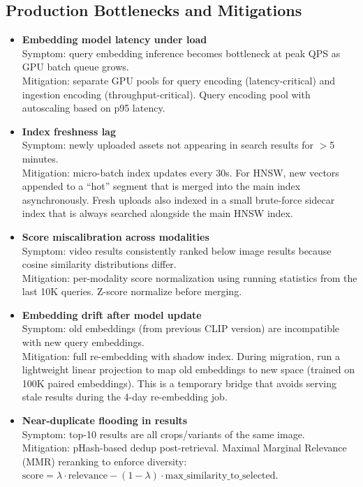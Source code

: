 \subsection*{Production Bottlenecks and Mitigations}

\begin{itemize}
  \item \textbf{Embedding model latency under load}\\
    Symptom: query embedding inference becomes bottleneck at peak QPS as GPU batch queue grows.\\
    Mitigation: separate GPU pools for query encoding (latency-critical) and ingestion encoding (throughput-critical). Query encoding pool with autoscaling based on p95 latency.

  \item \textbf{Index freshness lag}\\
    Symptom: newly uploaded assets not appearing in search results for $>$5 minutes.\\
    Mitigation: micro-batch index updates every 30s. For HNSW, new vectors appended to a ``hot'' segment that is merged into the main index asynchronously. Fresh uploads also indexed in a small brute-force sidecar index that is always searched alongside the main HNSW index.

  \item \textbf{Score miscalibration across modalities}\\
    Symptom: video results consistently ranked below image results because cosine similarity distributions differ.\\
    Mitigation: per-modality score normalization using running statistics from the last 10K queries. Z-score normalize before merging.

  \item \textbf{Embedding drift after model update}\\
    Symptom: old embeddings (from previous CLIP version) are incompatible with new query embeddings.\\
    Mitigation: full re-embedding with shadow index. During migration, run a lightweight linear projection to map old embeddings to new space (trained on 100K paired embeddings). This is a temporary bridge that avoids serving stale results during the 4-day re-embedding job.

  \item \textbf{Near-duplicate flooding in results}\\
    Symptom: top-10 results are all crops/variants of the same image.\\
    Mitigation: pHash-based dedup post-retrieval. Maximal Marginal Relevance (MMR) reranking to enforce diversity: $\text{score} = \lambda \cdot \text{relevance} - (1-\lambda) \cdot \text{max\_similarity\_to\_selected}$.


\end{itemize}
